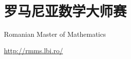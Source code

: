 
\chapter{罗马尼亚数学大师赛}
\label{chap:rmm}

\epigraph{Romanian Master of Mathematics}{\url{http://rmms.lbi.ro/}}

